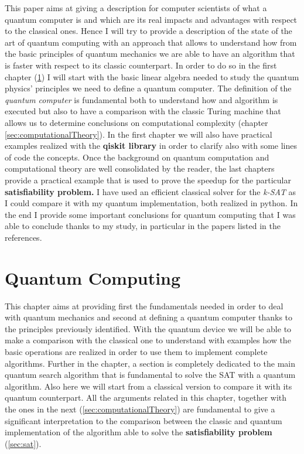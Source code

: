 \documentclass[english]{article}
\begin{document}
	This paper aims at giving a description for computer scientists of what a quantum computer is and which are its real impacts and advantages with respect to the classical ones. Hence I will try to provide a description of the state of the art of quantum computing with an approach that allows to understand how from the basic principles of quantum mechanics we are able to have an algorithm that is faster with respect to its classic counterpart. In order to do so in the first chapter (\ref{sec:quantumComputing}) I will start with the basic linear algebra needed to study the quantum physics' principles we need to define a quantum computer. The definition of the \emph{quantum computer} is fundamental both to understand how and algorithm is executed but also to have a comparison with the classic Turing machine that allows us to determine conclusions on computational complexity (chapter \ref{sec:computationalTheory}). In the first chapter we will also have practical examples realized with the \textbf{qiskit library} in order to clarify also with some lines of code the concepts. Once the background on quantum computation and computational theory are well consolidated by the reader, the last chapters provide a practical example that is used to prove the speedup for the particular \textbf{satisfiability problem.} I have used an efficient classical solver for the \emph{k-SAT} as I could compare it with my quantum implementation, both realized in python. In the end I provide some important conclusions for quantum computing that I was able to conclude thanks to my study, in particular in the papers listed in the references.
	
	\section{Quantum Computing}
	\label{sec:quantumComputing}
		This chapter aims at providing first the fundamentals needed in order to deal with quantum mechanics and second at defining a quantum computer thanks to the principles previously identified. With the quantum device we will be able to make a comparison with the classical one to understand with examples how the basic operations are realized in order to use them to implement complete algorithms. Further in the chapter, a section is completely dedicated to the main quantum search algorithm that is fundamental to solve the SAT with a quantum algorithm. Also here we will start from a classical version to compare it with its quantum counterpart. All the arguments related in this chapter, together with the ones in the next (\ref{sec:computationalTheory}) are fundamental to give a significant interpretation to the comparison between the classic and quantum implementation of the algorithm able to solve the \textbf{satisfiability problem} (\ref{sec:sat}).
		
\end{document}
